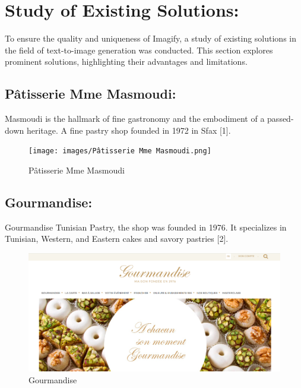 \section{Study of Existing Solutions:}

To ensure the quality and uniqueness of Imagify, a study of existing solutions in the
field of text-to-image generation was conducted. This section explores prominent solutions,
highlighting their advantages and limitations.

\subsection{Pâtisserie Mme Masmoudi:}

Masmoudi is the hallmark of fine gastronomy and the embodiment of a passed-down
heritage. A fine pastry shop founded in 1972 in Sfax [1].

\begin{figure}[!h]
\begin{center}
\texttt{[image: images/Pâtisserie Mme Masmoudi.png]}
\end{center}
\caption{Pâtisserie Mme Masmoudi}
\end{figure}

\newpage
\subsection{Gourmandise:}

Gourmandise Tunisian Pastry, the shop was founded in 1976. It specializes in Tunisian, Western, and Eastern cakes and savory pastries [2].

\begin{figure}[!h]
\begin{center}
\includegraphics[width=15cm]{images/Gourmandise.png}
\end{center}
\caption{Gourmandise}
\end{figure}

